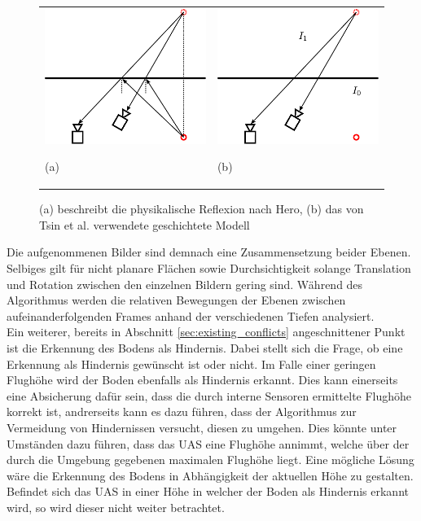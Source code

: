 \begin{figure}[h]
  	\centering
	\begin{tabular}{m{6.5cm} m{6.5cm}}
	\includegraphics[width=6.5cm]{img/reflection_model_hero.pdf}
	\begin{center} \small (a) \end{center}
	&
	\includegraphics[width=6.5cm]{img/reflection_model_layers.pdf}
	\begin{center} \small (b) \end{center}
	\end{tabular}
\caption{(a) beschreibt die physikalische Reflexion nach Hero, (b) das von Tsin et al. verwendete geschichtete Modell}
\label{fig:reflection_models}
\end{figure}

\noindent
Die aufgenommenen Bilder sind demnach eine Zusammensetzung beider Ebenen. Selbiges gilt für nicht planare Flächen sowie Durchsichtigkeit solange Translation und Rotation zwischen den einzelnen Bildern gering sind. Während des Algorithmus werden die relativen Bewegungen der Ebenen zwischen aufeinanderfolgenden Frames anhand der verschiedenen Tiefen analysiert.\\

\noindent
Ein weiterer, bereits in Abschnitt \ref{sec:existing_conflicts} angeschnittener Punkt ist die Erkennung des Bodens als Hindernis. Dabei stellt sich die Frage, ob eine Erkennung als Hindernis gewünscht ist oder nicht. Im Falle einer geringen Flughöhe wird der Boden ebenfalls als Hindernis erkannt. Dies kann einerseits eine Absicherung dafür sein, dass die durch interne Sensoren ermittelte Flughöhe korrekt ist, andrerseits kann es dazu führen, dass der Algorithmus zur Vermeidung von Hindernissen versucht, diesen zu  umgehen. Dies könnte unter Umständen dazu führen, dass das UAS eine Flughöhe annimmt, welche über der durch die Umgebung gegebenen maximalen Flughöhe liegt. Eine mögliche Lösung wäre die Erkennung des Bodens in Abhängigkeit der aktuellen Höhe zu gestalten. Befindet sich das UAS in einer Höhe in welcher der Boden als Hindernis erkannt wird, so wird dieser nicht weiter betrachtet. 

